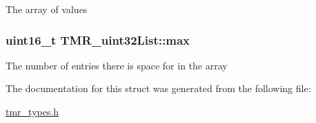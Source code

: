 The array of values \hypertarget{struct_t_m_r__uint32_list_5593bbc5fdbe37350b4c880ada7d7045}{
\subsubsection[{max}]{\setlength{\rightskip}{0pt plus 5cm}uint16\_\-t {\bf TMR\_\-uint32List::max}}}
\label{struct_t_m_r__uint32_list_5593bbc5fdbe37350b4c880ada7d7045}


The number of entries there is space for in the array 

The documentation for this struct was generated from the following file:\begin{CompactItemize}
\item 
\hyperlink{tmr__types_8h}{tmr\_\-types.h}\end{CompactItemize}
